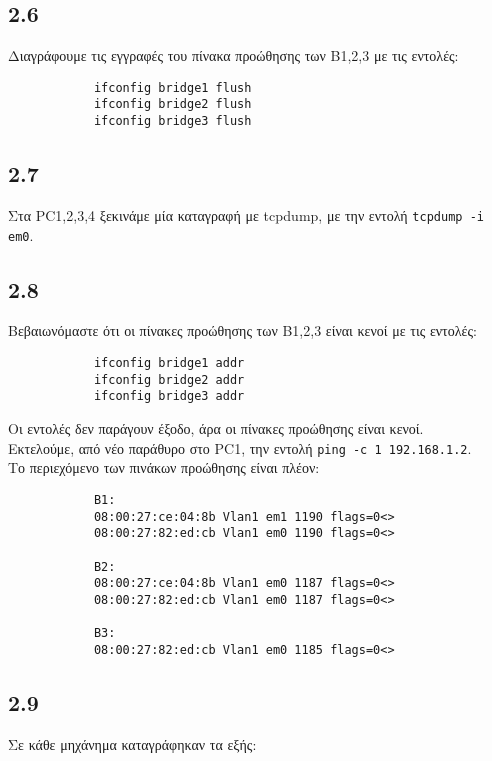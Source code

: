 \documentclass[a4paper, 12pt]{article}
\begin{document}
	\subsection*{2.6}
		Διαγράφουμε τις εγγραφές του πίνακα προώθησης των B1,2,3 με τις εντολές: 
		
		\begin{verbatim}
			ifconfig bridge1 flush
			ifconfig bridge2 flush
			ifconfig bridge3 flush
		\end{verbatim}

	\subsection*{2.7}
		Στα PC1,2,3,4 ξεκινάμε μία καταγραφή με tcpdump, με την εντολή \verb|tcpdump -i em0|.

	\subsection*{2.8}
		Βεβαιωνόμαστε ότι οι πίνακες προώθησης των B1,2,3 είναι κενοί με τις εντολές:
		
		\begin{verbatim}
			ifconfig bridge1 addr
			ifconfig bridge2 addr
			ifconfig bridge3 addr
		\end{verbatim}
		
		Οι εντολές δεν παράγουν έξοδο, άρα οι πίνακες προώθησης είναι κενοί. \\
		
		Εκτελούμε, από νέο παράθυρο στο PC1, την εντολή \verb|ping -c 1 192.168.1.2|. \\
		
		Το περιεχόμενο των πινάκων προώθησης είναι πλέον: 
		
		\begin{verbatim}
			B1: 
			08:00:27:ce:04:8b Vlan1 em1 1190 flags=0<>
			08:00:27:82:ed:cb Vlan1 em0 1190 flags=0<>
				
			B2:
			08:00:27:ce:04:8b Vlan1 em0 1187 flags=0<>
			08:00:27:82:ed:cb Vlan1 em0 1187 flags=0<>
			
			B3:
			08:00:27:82:ed:cb Vlan1 em0 1185 flags=0<>
		\end{verbatim}

	\subsection*{2.9}
		Σε κάθε μηχάνημα καταγράφηκαν τα εξής:
		
\end{document}
